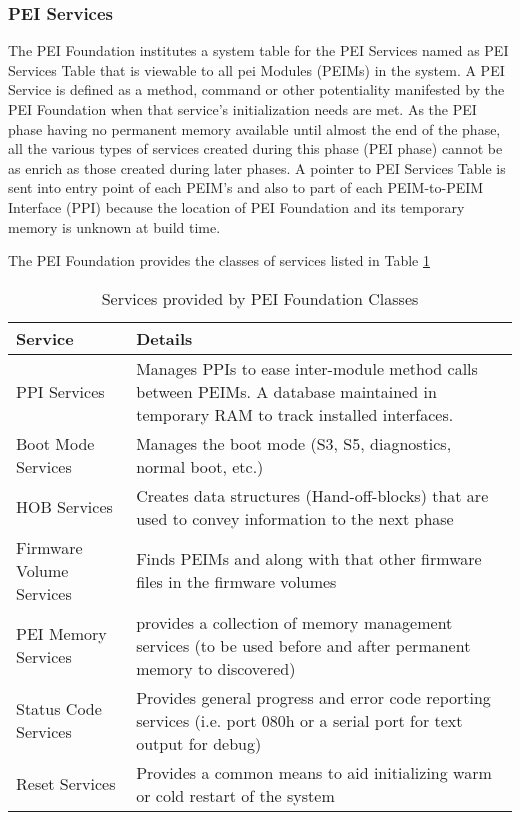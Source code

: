 \subsubsection{PEI Services}
The PEI Foundation institutes a system table for the PEI Services named as PEI Services Table that is viewable to all \gls{pei} Modules (PEIMs) in the system. A PEI Service is defined as a method, command or other potentiality manifested by the PEI Foundation when that service's initialization needs are met. As the PEI phase having no permanent memory available until almost the end of the phase, all the various types of services created during this phase (PEI phase) cannot be as enrich as those created during later phases. A pointer to PEI Services Table is sent into entry point of each PEIM's and also to part of each PEIM-to-PEIM Interface (PPI) because the location of PEI Foundation and its temporary memory is unknown at build time. 

The PEI Foundation provides the classes of services listed in Table \ref{table:design-pei-foundation-class-service}

\begin{table}[h]
	\centering
	\renewcommand*{\arraystretch}{2}
	\caption{Services provided by PEI Foundation Classes}\label{table:design-pei-foundation-class-service}
	\begin{tabular}{ l | p{9cm} }
		Service & Details
		\\ \hline \hline
		PPI Services & Manages PPIs to ease inter-module method calls between PEIMs. A database maintained in temporary RAM to track installed interfaces.
		\\ \hline
		Boot Mode Services & Manages the boot mode (S3, S5, diagnostics, normal boot, etc.)
		\\ \hline
		HOB Services & Creates data structures (Hand-off-blocks) that are used to convey information to the next phase 
		\\ \hline
		Firmware Volume Services & Finds PEIMs and along with that other firmware files in the firmware volumes
		\\ \hline
		PEI Memory Services & provides a collection of memory management services (to be used before and after permanent memory to discovered)
		\\ \hline
		Status Code Services & Provides general progress and error code reporting services (i.e. port 080h or a serial port for text output for debug)
		\\ \hline
		Reset Services & Provides a common means to aid initializing warm or cold restart of the system
		\\ \hline
	\end{tabular}

\end{table}



